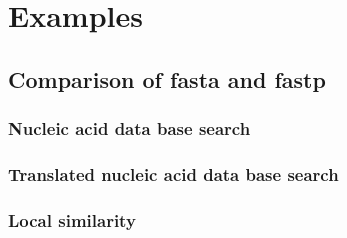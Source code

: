 \section{Examples}

	\subsection{Comparison of fasta and fastp}

		\subsubsection{Nucleic acid data base search}

		\subsubsection{Translated nucleic acid data base search}

		\subsubsection{Local similarity}
